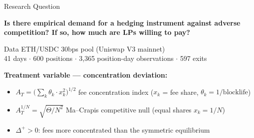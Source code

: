 \documentclass[aspectratio=169]{beamer}
\newcommand{\AT}{A_T}
\newcommand{\ThetaSum}{\Theta}
\newcommand{\PosCount}{N}
\newcommand{\ATnull}{A_T^{1/\PosCount}}
\newcommand{\DeltaPlus}{\Delta^{+}}
\newcommand{\thetapos}{\theta}
\begin{document}
\begin{frame}{Research Question}

\textbf{Is there empirical demand for a hedging instrument against adverse
competition? If so, how much are LPs willing to pay?}

\bigskip

\begin{block}{Data}
ETH/USDC 30bps pool (Uniswap V3 mainnet) \\
41 days $\cdot$ 600 positions $\cdot$ 3,365 position-day observations $\cdot$ 597 exits
\end{block}

\bigskip

\textbf{Treatment variable --- concentration deviation:}
\begin{center}
\boxed{
  \DeltaPlus = \max\!\bigl(0,\; \AT - \ATnull\bigr)
}
\end{center}

\begin{itemize}
  \item $\AT = \bigl(\sum_k \thetapos_k \cdot x_k^2\bigr)^{1/2}$ \quad
    fee concentration index ($x_k$ = fee share, $\thetapos_k = 1/\text{blocklife}$)
  \item $\ATnull = \sqrt{\ThetaSum / \PosCount^2}$ \quad
    Ma--Crapis competitive null (equal shares $x_k = 1/\PosCount$)
  \item $\DeltaPlus > 0$: fees more concentrated than the symmetric equilibrium
\end{itemize}

\end{frame}
\end{document}
